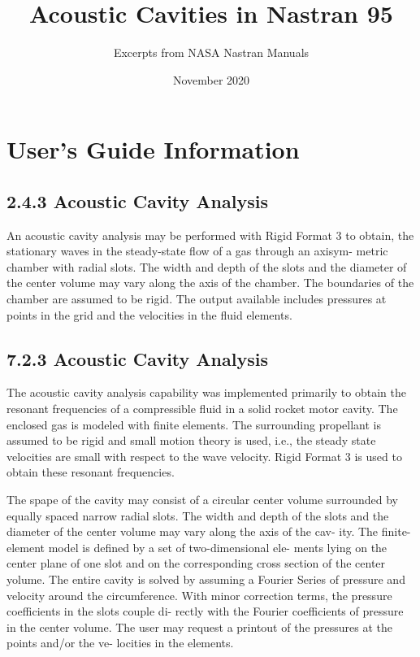 \documentclass{article}
\title{Acoustic Cavities in Nastran 95}
\author{Excerpts from NASA Nastran Manuals}
\date{November 2020}
\begin{document}
\maketitle

\section{User's Guide Information}

\subsection{2.4.3 Acoustic Cavity Analysis}

An acoustic cavity analysis may be performed with Rigid Format 3 to obtain,
the stationary waves in the steady-state flow of a gas through an axisym-
metric chamber with radial slots. The width and depth of the slots and the
diameter of the center volume may vary along the axis of the chamber. The
boundaries of the chamber are assumed to be rigid. The output available
includes pressures at points in the grid and the velocities in the fluid
elements.


\subsection{7.2.3 Acoustic Cavity Analysis}

The acoustic cavity analysis capability was implemented primarily to obtain
the resonant frequencies of a compressible fluid in a solid rocket motor
cavity. The enclosed gas is modeled with finite elements. The surrounding
propellant is assumed to be rigid and small motion theory is used, i.e., the
steady state velocities are small with respect to the wave velocity. Rigid
Format 3 is used to obtain these resonant frequencies.

The spape of the cavity may consist of a circular center volume surrounded
by equally spaced narrow radial slots. The width and depth of the slots
and the diameter of the center volume may vary along the axis of the cav-
ity. The finite-element model is defined by a set of two-dimensional ele-
ments lying on the center plane of one slot and on the corresponding cross
section of the center yolume. The entire cavity is solved by assuming a
Fourier Series of pressure and velocity around the circumference.
With minor correction terms, the pressure coefficients in the slots couple di-
rectly with the Fourier coefficients of pressure in the center volume. The
user may request a printout of the pressures at the points and/or the ve-
locities in the elements.
\end{document}
